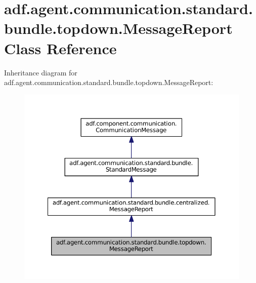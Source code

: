 \hypertarget{classadf_1_1agent_1_1communication_1_1standard_1_1bundle_1_1topdown_1_1MessageReport}{}\section{adf.\+agent.\+communication.\+standard.\+bundle.\+topdown.\+Message\+Report Class Reference}
\label{classadf_1_1agent_1_1communication_1_1standard_1_1bundle_1_1topdown_1_1MessageReport}


Inheritance diagram for adf.\+agent.\+communication.\+standard.\+bundle.\+topdown.\+Message\+Report\+:
\nopagebreak
\begin{figure}[H]
\begin{center}
\leavevmode
\includegraphics[width=350pt]{classadf_1_1agent_1_1communication_1_1standard_1_1bundle_1_1topdown_1_1MessageReport__inherit__graph}
\end{center}
\end{figure}


